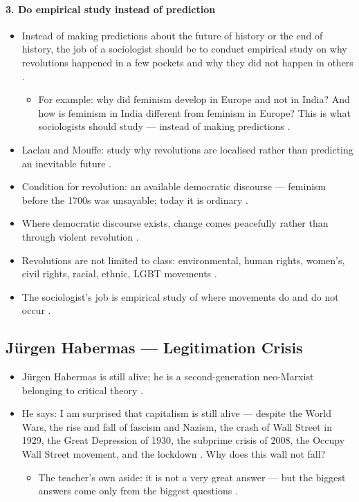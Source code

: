 \paragraph{3. Do empirical study instead of prediction}
\begin{itemize}
    \item Instead of making predictions about the future of history or the end of history, the job of a sociologist should be to conduct empirical study on why revolutions happened in a few pockets and why they did not happen in others .
    \begin{itemize}
        \item For example: why did feminism develop in Europe and not in India? And how is feminism in India different from feminism in Europe? This is what sociologists should study --- instead of making predictions .
    \end{itemize}
\end{itemize}

\begin{QuickRevision}
\begin{itemize}
    \item Laclau and Mouffe: study why revolutions are localised rather than predicting an inevitable future .
    \item Condition for revolution: an available democratic discourse --- feminism before the 1700s was unsayable; today it is ordinary .
    \item Where democratic discourse exists, change comes peacefully rather than through violent revolution .
    \item Revolutions are not limited to class: environmental, human rights, women's, civil rights, racial, ethnic, LGBT movements .
    \item The sociologist's job is empirical study of where movements do and do not occur .
\end{itemize}
\end{QuickRevision}

\subsection{J\"urgen Habermas --- Legitimation Crisis}
\begin{itemize}
    \item J\"urgen Habermas is still alive; he is a second-generation neo-Marxist belonging to critical theory .
    \item He says: I am surprised that capitalism is still alive --- despite the World Wars, the rise and fall of fascism and Nazism, the crash of Wall Street in 1929, the Great Depression of 1930, the subprime crisis of 2008, the Occupy Wall Street movement, and the lockdown . Why does this wall not fall? 
    \begin{itemize}
        \item The teacher's own aside: it is not a very great answer --- but the biggest answers come only from the biggest questions .
    \end{itemize}
\end{itemize}

